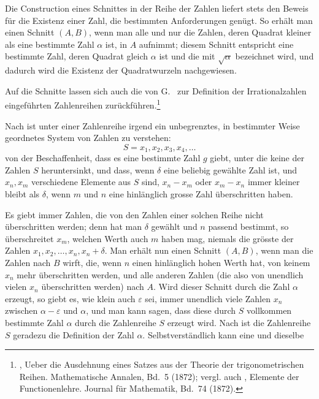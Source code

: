 
Die Construction eines Schnittes in der Reihe der Zahlen liefert
stets den Beweis für die Existenz einer Zahl, die bestimmten
Anforderungen genügt. So erhält man einen Schnitt $(A,B)$, wenn man
alle und nur die Zahlen, deren Quadrat kleiner als eine bestimmte Zahl
$\alpha$ ist, in $A$ aufnimmt; diesem Schnitt entspricht eine bestimmte
Zahl, deren Quadrat gleich $\alpha$ ist und die mit $\sqrt\alpha$
bezeichnet wird, und dadurch wird die Existenz der Quadratwurzeln
nachgewiesen.

Auf die Schnitte lassen sich auch die von G.\  zur
Definition der Irrationalzahlen eingeführten Zahlenreihen zurückführen.\setcounter{footnote}{0}\footnote{
, Ueber die Ausdehnung eines Satzes aus der Theorie der
trigonometrischen Reihen. Mathematische Annalen, Bd.~5 (1872); vergl.
auch , Elemente der Functionenlehre. Journal für
Mathematik, Bd.~74 (1872).}

Nach  ist unter einer Zahlenreihe irgend ein
unbegrenztes, in bestimmter Weise geordnetes System von Zahlen zu
verstehen:
\[
 S=x_1,x_2,x_3,x_4,\ldots
\]
von der Beschaffenheit, dass es eine bestimmte Zahl $g$ giebt, unter
die keine der Zahlen $S$ heruntersinkt, und dass, wenn $\delta$ eine
beliebig gewählte Zahl ist, und $x_n,x_m$ verschiedene Elemente aus
$S$ sind, $x_n-x_m$ oder $x_m-x_n$ immer kleiner bleibt als $\delta$,
wenn $m$ und $n$ eine hinlänglich grosse Zahl überschritten haben.

Es giebt immer Zahlen, die von den Zahlen einer solchen Reihe nicht
überschritten werden; denn hat man $\delta$ gewählt und $n$ passend
bestimmt, so überschreitet $x_m$, welchen Werth auch $m$ haben mag,
niemals die grösste der Zahlen $x_1,x_2,\ldots,x_n,x_n+\delta$. Man
erhält nun einen Schnitt $(A,B)$, wenn man die Zahlen nach $B$ wirft,
die, wenn $n$ einen hinlänglich hohen Werth hat, von keinem $x_n$ mehr
überschritten werden, und alle anderen Zahlen (die also von unendlich
vielen $x_n$ überschritten werden) nach $A$. Wird dieser Schnitt durch
die Zahl $\alpha$ erzeugt, so giebt es, wie klein auch $\varepsilon$
sei, immer unendlich viele Zahlen $x_n$ zwischen
$\alpha-\varepsilon$ und $\alpha$, und man kann sagen, dass diese durch
$S$ vollkommen bestimmte Zahl $\alpha$ durch die Zahlenreihe $S$
erzeugt wird. Nach  ist die Zahlenreihe $S$ geradezu
die Definition der Zahl $\alpha$. Selbstverständlich kann eine und dieselbe
